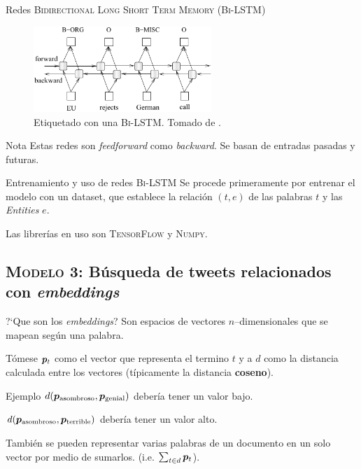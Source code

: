 \documentclass[10pt]{beamer}
\begin{document}
\begin{frame}{Redes \textsc{Bidirectional Long Short Term Memory (Bi-LSTM)}}
  \begin{figure}[H]
    \centering
    \includegraphics[width=0.6\textwidth]{Images/bilstm-arch.pdf}
    \caption[Etiquetado con una \textsc{Bi-LSTM}]{Etiquetado con una \textsc{Bi-LSTM}. Tomado de \cite{Huang2015}.}
    \label{fig:bilstm-arch}
  \end{figure}

  \begin{alertblock}{Nota}
    Estas redes son \emph{feedforward} como \emph{backward}. Se basan de entradas pasadas y futuras.
  \end{alertblock}
\end{frame}


\begin{frame}{Entrenamiento y uso de redes \textsc{Bi-LSTM}}
  Se procede primeramente por entrenar el modelo con un dataset, que establece la relación $(t, e)$ de las palabras $t$ y las \emph{Entities} $e$.

  Las librerías en uso son \textsc{TensorFlow} y \textsc{Numpy}.
\end{frame}

\subsection{\textsc{Modelo 3:} Búsqueda de tweets relacionados con \emph{embeddings}}

\begin{frame}{?`Que son los \emph{embeddings}?}
  Son espacios de vectores $n$--dimensionales que se mapean según una palabra.

  Tómese ${\bm{p}}_{t}$ como el vector que representa el termino $t$ y a $d$ como la distancia calculada entre los vectores (típicamente la distancia \textbf{coseno}).

  \begin{alertblock}{Ejemplo}
    $d({\bm{p}}_{\text{asombroso}}, {\bm{p}}_{\text{genial}})$ debería tener un valor bajo.
    
    $d({\bm{p}}_{\text{asombroso}}, {\bm{p}}_{\text{terrible}})$ debería tener un valor alto.
  \end{alertblock}

  También se pueden representar varias palabras de un documento en un solo vector por medio de sumarlos. (i.e. $\sum_{t \in d}{\bm{p}}_{t}$).
\end{frame}
\end{document}
